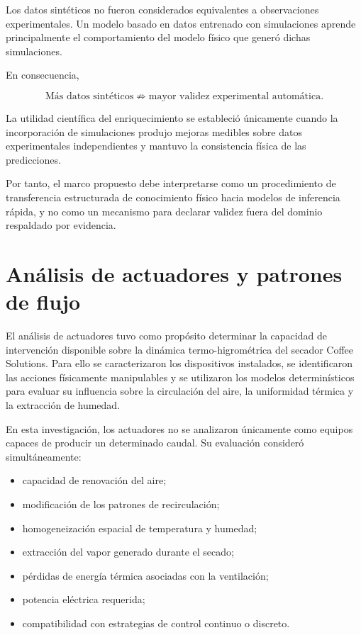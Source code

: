 Los datos sintéticos no fueron considerados equivalentes a observaciones experimentales. Un modelo basado en datos entrenado con simulaciones aprende principalmente el comportamiento del modelo físico que generó dichas simulaciones.

En consecuencia,

\begin{equation}
\boxed{
\text{Más datos sintéticos}
\not\Rightarrow
\text{mayor validez experimental automática}.
}
\end{equation}

La utilidad científica del enriquecimiento se estableció únicamente cuando la incorporación de simulaciones produjo mejoras medibles sobre datos experimentales independientes y mantuvo la consistencia física de las predicciones.

Por tanto, el marco propuesto debe interpretarse como un procedimiento de transferencia estructurada de conocimiento físico hacia modelos de inferencia rápida, y no como un mecanismo para declarar validez fuera del dominio respaldado por evidencia.

\section{Análisis de actuadores y patrones de flujo}
\label{sec:analisis_actuadores}

El análisis de actuadores tuvo como propósito determinar la capacidad de intervención disponible sobre la dinámica termo-higrométrica del secador Coffee Solutions. Para ello se caracterizaron los dispositivos instalados, se identificaron las acciones físicamente manipulables y se utilizaron los modelos determinísticos para evaluar su influencia sobre la circulación del aire, la uniformidad térmica y la extracción de humedad.

En esta investigación, los actuadores no se analizaron únicamente como equipos capaces de producir un determinado caudal. Su evaluación consideró simultáneamente:

\begin{itemize}
    \item capacidad de renovación del aire;
    \item modificación de los patrones de recirculación;
    \item homogeneización espacial de temperatura y humedad;
    \item extracción del vapor generado durante el secado;
    \item pérdidas de energía térmica asociadas con la ventilación;
    \item potencia eléctrica requerida;
    \item compatibilidad con estrategias de control continuo o discreto.
\end{itemize}


